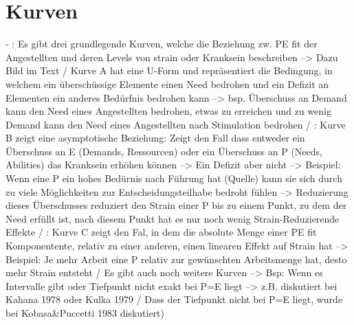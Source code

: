 \section{Kurven}
\label{ch:personEnvironmentFit:kurven}
- \cite[S. 5]{caplan:1987}: Es gibt drei grundlegende Kurven, welche die Beziehung zw. PE fit der Angestellten und deren Levels von strain oder Kranksein beschreiben --> Dazu Bild im Text / Kurve A hat eine U-Form und repräsentiert die Bedingung, in welchem ein überschüssige Elemente einen Need bedrohen und ein Defizit an Elementen ein anderes Bedürfnis bedrohen kann --> bsp. Überschuss an Demand kann den Need eines Angestellten bedrohen, etwas zu erreichen und zu wenig Demand kann den Need eines Angestellten nach Stimulation bedrohen / \cite[S. 5f.]{caplan:1987}: Kurve B zeigt eine asymptotische Beziehung: Zeigt den Fall dass entweder ein Überschuss an E (Demands, Ressourcen) oder ein Überschuss an P (Needs, Abilities) das Kranksein erhöhen können --> Ein Defizit aber nicht --> Beispiel: Wenn eine P ein hohes Bedürnis nach Führung hat (Quelle) kann sie sich durch zu viele Möglichkeiten zur Entscheidungsteilhabe bedroht fühlen --> Reduzierung dieses Überschusses reduziert den Strain einer P bis zu einem Punkt, zu dem der Need erfüllt ist, nach diesem Punkt hat es nur noch wenig Strain-Reduzierende Effekte / \cite[S. 6]{caplan:1987}: Kurve C zeigt den Fal, in dem die absolute Menge einer PE fit Komponentente, relativ zu einer anderen, einen linearen Effekt auf Strain hat --> Beispiel: Je mehr Arbeit eine P relativ zur gewünschten Arbeitsmenge hat, desto mehr Strain entsteht / Es gibt auch noch weitere Kurven --> Bsp: Wenn es Intervalle gibt oder Tiefpunkt nicht exakt bei P=E liegt --> z.B. diskutiert bei Kahana 1978 oder Kulka 1979 / Dass der Tiefpunkt nicht bei P=E liegt, wurde bei Kobasa\&Puccetti 1983 diskutiert) \\
